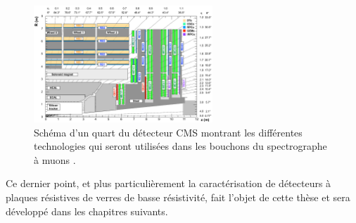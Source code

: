 \begin{itemize}[label=$\bullet$]
	\begin{figure}[ht!]
	\centering
	\includegraphics[width=0.60\textwidth]{CMS/endcap.png}
	\captionsetup{type=figure}\caption{Schéma d'un quart du détecteur CMS montrant les différentes technologies qui seront utilisées dans les bouchons du spectrographe à muons \cite{Contardo:2020886}.}
	\label{end}
\end{figure}
\end{itemize}
Ce dernier point, et plus particulièrement la caractérisation de détecteurs à plaques résistives de verres de basse résistivité, fait l'objet de cette thèse et sera développé dans les chapitres suivants.